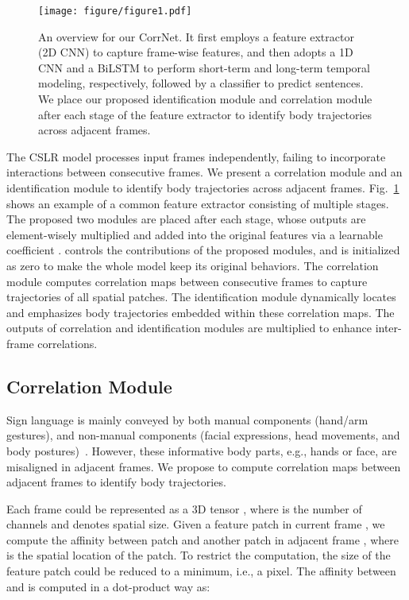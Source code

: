 \documentclass[10pt,twocolumn,letterpaper]{article}
\begin{document}
\begin{figure}[t]
  \centering
  \texttt{[image: figure/figure1.pdf]}
  \caption{An overview for our CorrNet. It first employs a feature extractor (2D CNN) to capture frame-wise features, and then adopts a 1D CNN and a BiLSTM to perform short-term and long-term temporal modeling, respectively, followed by a classifier to predict sentences. We place our proposed identification module and correlation module after each stage of the feature extractor to identify body trajectories across adjacent frames.}
  \label{fig1}
  \end{figure}

The CSLR model processes input frames independently, failing to incorporate interactions between consecutive frames. We present a correlation module and an identification module to identify body trajectories across adjacent frames. Fig.~\ref{fig1} shows an example of a common feature extractor consisting of multiple stages. The proposed two modules are placed after each stage, whose outputs are element-wisely multiplied and added into the original features via a learnable coefficient .  controls the contributions of the proposed modules, and is initialized as zero to make the whole model keep its original behaviors. The correlation module computes correlation maps between consecutive frames to capture trajectories of all spatial patches. The identification module dynamically locates and emphasizes body trajectories embedded within these correlation maps. The outputs of correlation and identification modules are
multiplied to enhance inter-frame correlations.

\subsection{Correlation Module}
Sign language is mainly conveyed by both manual components (hand/arm gestures), and non-manual components (facial expressions, head movements, and body postures)~\cite{dreuw2007speech,ong2005automatic}. However, these informative body parts, e.g., hands or face, are misaligned in adjacent frames. We propose to compute correlation maps between adjacent frames to identify body trajectories. 

Each frame could be represented as a 3D tensor , where  is the number of channels and  denotes spatial size. Given a feature patch  in current frame , we compute the affinity between patch  and another patch  in adjacent frame , where  is the spatial location of the patch. To restrict the computation, the size of the feature patch could be reduced to a minimum, i.e., a pixel. The affinity between  and  is computed in a dot-product way as: 
\end{document}
